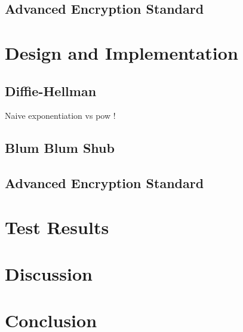 \documentclass{article}
\begin{document}
\subsection{Advanced Encryption Standard}



\section{Design and Implementation}

\subsection{Diffie-Hellman}
Naive exponentiation vs pow !

\subsection{Blum Blum Shub}

\subsection{Advanced Encryption Standard}


\section{Test Results}
\section{Discussion}
\section{Conclusion}





\end{document}
